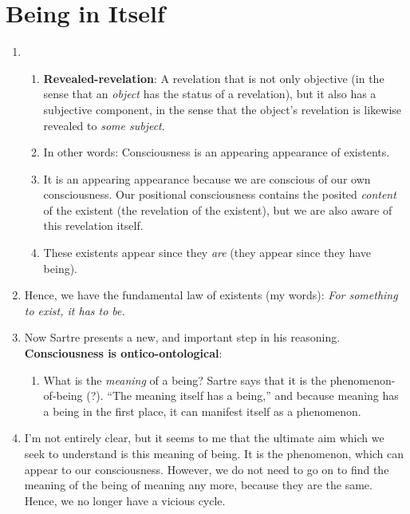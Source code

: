 \section{Being in Itself}

\begin{enumerate}
  \item {}
  \begin{enumerate}
    \item \textbf{Revealed-revelation}: A revelation that is not only objective (in the sense that an \emph{object} has the status of a revelation), but it also has a subjective component, in the sense that the object's revelation is likewise revealed to \emph{some subject}.
    \item In other words: Consciousness is an appearing appearance of existents.
    \item It is an appearing appearance because we are conscious of our own consciousness. Our positional consciousness contains the posited \emph{content} of the existent (the revelation of the existent), but we are also aware of this revelation itself.
    \item These existents appear since they \emph{are} (they appear since they have being).
  \end{enumerate}
  \item Hence, we have the fundamental law of existents (my words): \emph{For something to exist, it has to be.}
  \item Now Sartre presents a new, and important step in his reasoning. \textbf{Consciousness is ontico-ontological}:  
  \begin{enumerate}
    \item What is the \emph{meaning} of a being? Sartre says that it is the phenomenon-of-being (?). \enquote{The meaning itself has a being,} and because meaning has a being in the first place, it can manifest itself as a phenomenon.
  \end{enumerate}
  \item I'm not entirely clear, but it seems to me that the ultimate aim which we seek to understand is this meaning of being. It is the phenomenon, which can appear to our consciousness. However, we do not need to go on to find the meaning of the being of meaning any more, because they are the same. Hence, we no longer have a vicious cycle.

\end{enumerate}
